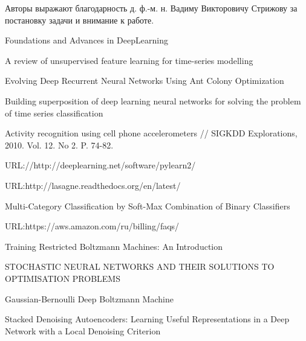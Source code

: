 \documentclass[12pt,twoside]{article}
\begin{document}
Авторы выражают благодарность д. ф.-м. н. Вадиму Викторовичу Стрижову за постановку задачи и внимание к работе.
\begin{thebibliography}{1}

Foundations and Advances
in DeepLearning

A review of unsupervised feature learning for time-series modelling

Evolving Deep Recurrent Neural Networks Using Ant
Colony Optimization

Building superposition of deep learning neural networks
for solving the problem of time series classification

 Activity recognition using cell phone
accelerometers // SIGKDD Explorations, 2010. Vol. 12. No 2. P. 74-82.

URL://http://deeplearning.net/software/pylearn2/

URL:http://lasagne.readthedocs.org/en/latest/

Multi-Category Classification by Soft-Max
Combination of Binary Classifiers

URL:https://aws.amazon.com/ru/billing/faqs/

Training Restricted Boltzmann Machines: An Introduction

STOCHASTIC NEURAL NETWORKS AND THEIR
SOLUTIONS TO OPTIMISATION PROBLEMS

Gaussian-Bernoulli Deep Boltzmann Machine

Stacked Denoising Autoencoders: Learning Useful Representations in
a Deep Network with a Local Denoising Criterion


\end{thebibliography}
\end{document}
